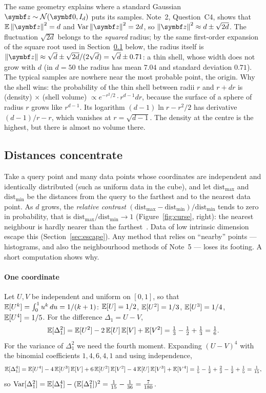 \documentclass[11pt]{article}
\begin{document}
The same geometry explains where a standard Gaussian $\vect{z} \sim \Normal(\vect{0}, I_d)$ puts its samples.
Note~2, Question~C4, shows that $\E\norm{\vect{z}}^2 = d$ and $\Var\norm{\vect{z}}^2 = 2d$, so
$\norm{\vect{z}}^2 \approx d \pm \sqrt{2d}$. The fluctuation $\sqrt{2d}$ belongs to the \emph{squared} radius; by the
same first-order expansion of the square root used in Section~\ref{sec:concentrate} below, the radius itself is
$\norm{\vect{z}} \approx \sqrt d \pm \sqrt{2d}/(2\sqrt d) = \sqrt d \pm 0.71$: a thin shell, whose width does not
grow with $d$ (in $d = 50$ the radius has mean $7.04$ and standard deviation $0.71$). The typical samples are nowhere near the most
probable point, the origin. Why the shell wins: the probability of the thin shell between radii $r$ and $r + dr$ is
(density) $\times$ (shell volume) $\propto e^{-r^2/2} \cdot r^{d-1} dr$, because the surface of a sphere of radius $r$
grows like $r^{d-1}$. Its logarithm $(d - 1) \ln r - r^2/2$ has derivative $(d - 1)/r - r$, which vanishes at
$r = \sqrt{d - 1}$. The density at the centre is the highest, but there is almost no volume there.

\subsection{Distances concentrate}\label{sec:concentrate}

Take a query point and many data points whose coordinates are independent and identically distributed (such as
uniform data in the cube), and let $\mathrm{dist}_{\max}$ and $\mathrm{dist}_{\min}$ be the distances from the query
to the farthest and to the nearest data point. As $d$ grows, the \emph{relative contrast}
$(\mathrm{dist}_{\max} - \mathrm{dist}_{\min})/\mathrm{dist}_{\min}$ tends to zero in probability, that is
$\mathrm{dist}_{\max}/\mathrm{dist}_{\min} \to 1$ (Figure~\ref{fig:curse}, right): the nearest neighbour is hardly
nearer than the farthest~\cite{beyer1999}. Data of low intrinsic dimension escape this (Section~\ref{sec:escape}).
Any method that relies on ``nearby'' points --- histograms, and also the neighbourhood methods of Note~5 --- loses its
footing. A short computation shows why.

\paragraph{One coordinate} Let $U, V$ be independent and uniform on $[0, 1]$, so that $\mathbb{E}[U^k] = \int_0^1 u^k\, du =
1/(k + 1)$: $\mathbb{E}[U] = 1/2$, $\mathbb{E}[U^2] = 1/3$, $\mathbb{E}[U^3] = 1/4$, $\mathbb{E}[U^4] = 1/5$. For the difference $\Delta_1 = U - V$,
\[
  \mathbb{E}[\Delta_1^2] = \mathbb{E}[U^2] - 2\,\mathbb{E}[U]\,\mathbb{E}[V] + \mathbb{E}[V^2] = \tfrac13 - \tfrac12 + \tfrac13 = \tfrac16 .
\]
For the variance of $\Delta_1^2$ we need the fourth moment. Expanding $(U - V)^4$ with the binomial coefficients
$1, 4, 6, 4, 1$ and using independence,
\[
  \mathbb{E}[\Delta_1^4] = \mathbb{E}[U^4] - 4\,\mathbb{E}[U^3]\,\mathbb{E}[V] + 6\,\mathbb{E}[U^2]\,\mathbb{E}[V^2] - 4\,\mathbb{E}[U]\,\mathbb{E}[V^3] + \mathbb{E}[V^4]
  = \tfrac15 - \tfrac12 + \tfrac23 - \tfrac12 + \tfrac15 = \tfrac{1}{15},
\]
so $\operatorname{Var}[\Delta_1^2] = \mathbb{E}[\Delta_1^4] - (\mathbb{E}[\Delta_1^2])^2 = \tfrac{1}{15} - \tfrac{1}{36} = \tfrac{7}{180}$.
\end{document}
